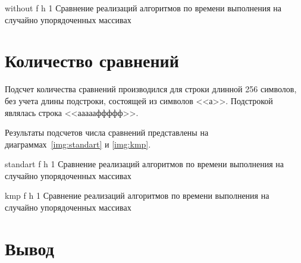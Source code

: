 {without} %
{f} %
{h} %
{1\textwidth} %
{Сравнение реализаций алгоритмов по времени выполнения на случайно упорядоченных массивах} %

\clearpage


\section{Количество сравнений}

Подсчет количества сравнений производился для строки длинной 256 символов, без учета длины подстроки, состоящей из символов <<а>>. Подстрокой являлась строка <<аааааффффф>>. 

Результаты подсчетов числа сравнений представлены на диаграммах~\ref{img:standart} и \ref{img:kmp}.

{standart} %
{f} %
{h} %
{1\textwidth} %
{Сравнение реализаций алгоритмов по времени выполнения на случайно упорядоченных массивах} %


{kmp} %
{f} %
{h} %
{1\textwidth} %
{Сравнение реализаций алгоритмов по времени выполнения на случайно упорядоченных массивах} %


\section*{Вывод}
